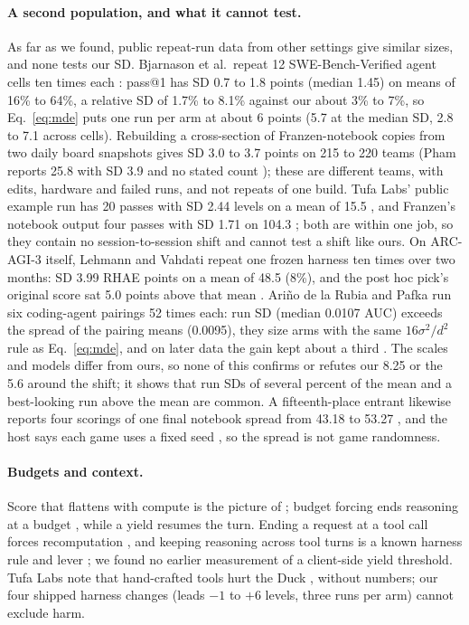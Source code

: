 \paragraph{A second population, and what it cannot test.}
As far as we found, public repeat-run data from other settings give similar sizes, and none tests our SD. Bjarnason et al.\ repeat 12 SWE-Bench-Verified agent cells ten times each \citep{bjarnason2026randomness}: pass@1 has SD 0.7 to 1.8 points (median 1.45) on means of 16\% to 64\%, a relative SD of 1.7\% to 8.1\% against our about 3\% to 7\%, so Eq.~\ref{eq:mde} puts one run per arm at about 6 points (5.7 at the median SD, 2.8 to 7.1 across cells). %
Rebuilding a cross-section of Franzen-notebook copies from two daily board snapshots gives SD 3.0 to 3.7 points on 215 to 220 teams (Pham reports 25.8 with SD 3.9 and no stated count \citep{pham2026forum745062}); these are different teams, with edits, hardware and failed runs, and not repeats of one build. %
Tufa Labs' public example run has 20 passes with SD 2.44 levels on a mean of 15.5 \citep{bessis2026duck,tufalabs2026duckcode}, and Franzen's notebook output four passes with SD 1.71 on 104.3 \citep{franzen2026milestone2}; both are within one job, so they contain no session-to-session shift and cannot test a shift like ours. %
On ARC-AGI-3 itself, Lehmann and Vahdati repeat one frozen harness ten times over two months: SD 3.99 RHAE points on a mean of 48.5 (8\%), and the post hoc pick's original score sat 5.0 points above that mean \citep{lehmann2026harness}. Ari\~no de la Rubia and Pafka run six coding-agent pairings 52 times each: run SD (median 0.0107 AUC) exceeds the spread of the pairing means (0.0095), they size arms with the same $16\sigma^2/d^2$ rule as Eq.~\ref{eq:mde}, and on later data the gain kept about a third \citep{arino2026identical}. The scales and models differ from ours, so none of this confirms or refutes our 8.25 or the 5.6 around the shift; it shows that run SDs of several percent of the mean and a best-looking run above the mean are common. A fifteenth-place entrant likewise reports four scorings of one final notebook spread from 43.18 to 53.27 \citep{pomcho2026forum756379}, and the host says each game uses a fixed seed \citep{kamradt2026forum694153}, so the spread is not game randomness.

\paragraph{Budgets and context.}
Score that flattens with compute is the picture of \citet{pourcel2025soar}; budget forcing ends reasoning at a budget \citep{muennighoff2025s1}, while a yield resumes the turn.
Ending a request at a tool call forces recomputation \citep{abhyankar2024infercept}, and keeping reasoning across tool turns is a known harness rule and lever \citep{deepseek2025v32,kamradt2026astra}; we found no earlier measurement of a client-side yield threshold.
Tufa Labs note that hand-crafted tools hurt the Duck \citep{arcprize2026milestone1}, without numbers; our four shipped harness changes (leads $-1$ to $+6$ levels, three runs per arm) cannot exclude harm. %

